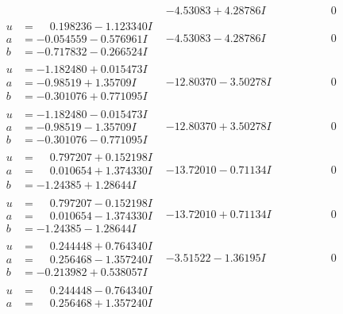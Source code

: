 \documentclass[1p]{elsarticle_modified}
\theoremstyle{definition}
\begin{document}
$$\begin{array}{c|c|c}
 & -4.53083 + 4.28786 I & \phantom{-0.000000 } 0 \\ \hline\begin{aligned}
u &= \phantom{-}0.198236 - 1.123340 I \\
a &= -0.054559 - 0.576961 I \\
b &= -0.717832 - 0.266524 I\end{aligned}
 & -4.53083 - 4.28786 I & \phantom{-0.000000 } 0 \\ \hline\begin{aligned}
u &= -1.182480 + 0.015473 I \\
a &= -0.98519 + 1.35709 I \\
b &= -0.301076 + 0.771095 I\end{aligned}
 & -12.80370 - 3.50278 I & \phantom{-0.000000 } 0 \\ \hline\begin{aligned}
u &= -1.182480 - 0.015473 I \\
a &= -0.98519 - 1.35709 I \\
b &= -0.301076 - 0.771095 I\end{aligned}
 & -12.80370 + 3.50278 I & \phantom{-0.000000 } 0 \\ \hline\begin{aligned}
u &= \phantom{-}0.797207 + 0.152198 I \\
a &= \phantom{-}0.010654 + 1.374330 I \\
b &= -1.24385 + 1.28644 I\end{aligned}
 & -13.72010 - 0.71134 I & \phantom{-0.000000 } 0 \\ \hline\begin{aligned}
u &= \phantom{-}0.797207 - 0.152198 I \\
a &= \phantom{-}0.010654 - 1.374330 I \\
b &= -1.24385 - 1.28644 I\end{aligned}
 & -13.72010 + 0.71134 I & \phantom{-0.000000 } 0 \\ \hline\begin{aligned}
u &= \phantom{-}0.244448 + 0.764340 I \\
a &= \phantom{-}0.256468 - 1.357240 I \\
b &= -0.213982 + 0.538057 I\end{aligned}
 & -3.51522 - 1.36195 I & \phantom{-0.000000 } 0 \\ \hline\begin{aligned}
u &= \phantom{-}0.244448 - 0.764340 I \\
a &= \phantom{-}0.256468 + 1.357240 I \\

\end{aligned}
\end{array}$$
\end{document}
